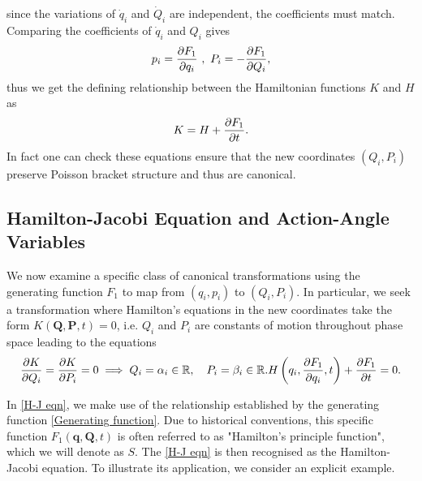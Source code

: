 \documentclass[12pt,oneside]{report}
\theoremstyle{definition}
\begin{document}
since the variations of $\dot{q}_{i}$ and $\dot{Q}_{i}$ are independent, the coefficients must match. Comparing the coefficients of $\dot{q}_{i}$ and $Q_{i}$ gives
\begin{equation} \label{Generating function}
 p_{i} = \displaystyle\frac{\partial F_{1}}{\partial q_{i}} \ , \ P_{i} = -\displaystyle\frac{\partial F_{1}}{\partial Q_{i}},   
\end{equation} 
 thus we get the defining relationship between the Hamiltonian functions $K$ and $H$ as
\begin{equation}
    K = H + \displaystyle\frac{\partial F_{1}}{\partial t}.
\end{equation}
In fact one can check these equations ensure that the new coordinates $(Q_{i},P_{i})$ preserve Poisson bracket structure and thus are canonical. 





\subsection{Hamilton-Jacobi Equation and Action-Angle Variables}
We now examine a specific class of canonical transformations using the generating function $F_{1}$ to map from $(q_{i},p_{i}) $ to $ (Q_{i}, P_{i})$. In particular, we seek a transformation where Hamilton’s equations in the new coordinates take the form $K(\textbf{Q},\textbf{P},t) = 0$, i.e. $Q_{i}$ and $P_{i}$ are constants of motion throughout phase space leading to the equations
\begin{subequations} \begin{equation} \label{genHam} \pd{K}{Q_{i}} = \pd{K}{P_{i}} = 0 \implies Q_{i} = \alpha_{i} \in \R, \quad P_{i} = \beta_{i} \in \R. \end{equation} \begin{equation}\label{H-J eqn} H\left(q_{i},\pd{F_{1}}{q_{i}},t \right) + \pd{F_{1}}{t} = 0. \end{equation} \end{subequations}


In \autoref{H-J eqn}, we make use of the relationship established by the generating function \autoref{Generating function}. Due to historical conventions, this specific function $F_{1}(\textbf{q},\textbf{Q},t)$ is often referred to as "Hamilton's principle function", which we will denote as $S$. The \autoref{H-J eqn} is then recognised as the Hamilton-Jacobi equation. To illustrate its application, we consider an explicit example.
\end{document}
